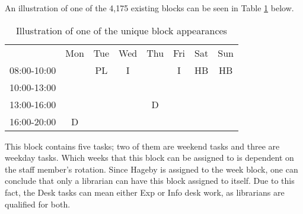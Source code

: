 An illustration of one of the 4,175 existing blocks can be seen in Table \ref{block_example} below.
\begin{table}[!h]
\centering
\caption{Illustration of one of the unique block appearances}
\label{block_example}
\begin{tabular}{cccccccc}
                           & Mon                                            & Tue                                             & Wed                    & Thu                                            & Fri                    & Sat                                             & Sun                                             \\ \cline{2-8} 
\multicolumn{1}{c|}{08:00-10:00}  & \multicolumn{1}{c|}{}                          & \multicolumn{1}{c|}{\cellcolor[HTML]{FCFF2F}PL} & \multicolumn{1}{c|}{I} & \multicolumn{1}{c|}{}                          & \multicolumn{1}{c|}{I} & \multicolumn{1}{c|}{\cellcolor[HTML]{FCFF2F}HB} & \multicolumn{1}{c|}{\cellcolor[HTML]{FCFF2F}HB} \\ \cline{2-8} 
\multicolumn{1}{c|}{10:00-13:00} & \multicolumn{1}{c|}{}                          & \multicolumn{1}{c|}{\cellcolor[HTML]{FCFF2F}}   & \multicolumn{1}{c|}{}  & \multicolumn{1}{c|}{}                          & \multicolumn{1}{c|}{}  &                                                 &                                                 \\ \cline{2-6}
\multicolumn{1}{c|}{13:00-16:00} & \multicolumn{1}{c|}{}                          & \multicolumn{1}{c|}{\cellcolor[HTML]{FCFF2F}}   & \multicolumn{1}{c|}{}  & \multicolumn{1}{c|}{\cellcolor[HTML]{FCFF2F}D} & \multicolumn{1}{c|}{}  &                                                 &                                                 \\ \cline{2-6}
\multicolumn{1}{c|}{16:00-20:00} & \multicolumn{1}{c|}{\cellcolor[HTML]{FCFF2F}D} & \multicolumn{1}{c|}{}                           & \multicolumn{1}{c|}{}  & \multicolumn{1}{c|}{}                          & \multicolumn{1}{c|}{}  &                                                 &                                                 \\ \cline{2-6}
\end{tabular}
\end{table}

This block contains five tasks; two of them are weekend tasks and three are weekday tasks. Which weeks that this block can be assigned to is dependent on the staff member's rotation. Since Hageby is assigned to the week block, one can conclude that only a librarian can have this block assigned to itself. Due to this fact, the Desk tasks can mean either Exp or Info desk work, as librarians are qualified for both.


